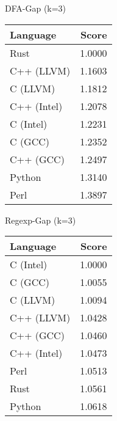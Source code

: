 \begin{subtable}{0.33\textwidth}
    \centering
    \caption{DFA-Gap (k=3)}
    \label{table:energy:dfa_gap}
    \begin{tabular}{|l|r|}
        \hline
        Language & Score \\
        \hline
        Rust & 1.0000 \\
        C++ (LLVM) & 1.1603 \\
        C (LLVM) & 1.1812 \\
        C++ (Intel) & 1.2078 \\
        C (Intel) & 1.2231 \\
        C (GCC) & 1.2352 \\
        C++ (GCC) & 1.2497 \\
        Python & 1.3140 \\
        Perl & 1.3897 \\
        \hline
    \end{tabular}
\end{subtable}%
\begin{subtable}{0.33\textwidth}
    \centering
    \caption{Regexp-Gap (k=3)}
    \label{table:energy:regexp}
    \begin{tabular}{|l|r|}
        \hline
        Language & Score \\
        \hline
        C (Intel) & 1.0000 \\
        C (GCC) & 1.0055 \\
        C (LLVM) & 1.0094 \\
        C++ (LLVM) & 1.0428 \\
        C++ (GCC) & 1.0460 \\
        C++ (Intel) & 1.0473 \\
        Perl & 1.0513 \\
        Rust & 1.0561 \\
        Python & 1.0618 \\
        \hline
    \end{tabular}
\end{subtable}
